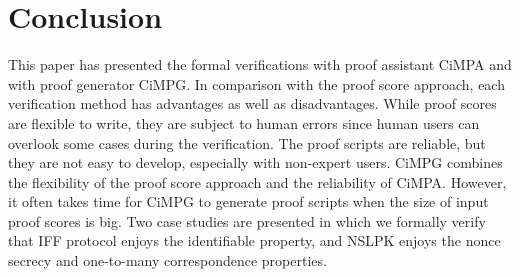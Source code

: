 \documentclass[10pt, conference, compsocconf]{IEEEtran}
\begin{document}
	\section{Conclusion}
	\label{sect_concl}
	This paper has presented the formal verifications with proof assistant CiMPA and with proof generator CiMPG. 
	In comparison with the proof score approach, each verification method has advantages as well as disadvantages. 
	While proof scores are flexible to write, they are subject to human errors since human users can overlook some cases during the verification. 
	The proof scripts are reliable, but they are not easy to develop, especially with non-expert users. 
	CiMPG combines the flexibility of the proof score approach and the reliability of CiMPA. However, it often takes time for CiMPG to generate proof scripts when the size of input proof scores is big. 
	Two case studies are presented in which we formally verify that IFF protocol enjoys the identifiable property, and NSLPK enjoys the nonce secrecy and one-to-many correspondence properties.
	
	
	
\end{document}
